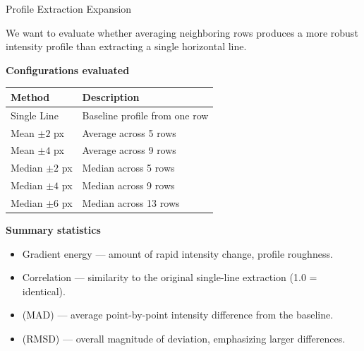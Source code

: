 \documentclass[aspectratio=169]{beamer}
\begin{document}
\begin{frame}{Profile Extraction Expansion}

We want to evaluate whether averaging neighboring rows produces a more robust intensity
profile than extracting a single horizontal line.


\textbf{Configurations evaluated}

\begin{table}
\centering
\small
\begin{tabular}{ll}
\toprule
Method & Description\\
\midrule
Single Line & Baseline profile from one row\\
Mean $\pm2$ px & Average across 5 rows\\
Mean $\pm4$ px & Average across 9 rows\\
Median $\pm2$ px & Median across 5 rows\\
Median $\pm4$ px & Median across 9 rows\\
Median $\pm6$ px & Median across 13 rows\\
\bottomrule
\end{tabular}
\end{table}


\textbf{Summary statistics}

\begin{itemize}
\item Gradient energy — amount of rapid intensity change, profile roughness.
\item Correlation — similarity to the original single-line extraction (1.0 = identical).
\item (MAD) — average point-by-point intensity difference from the baseline.
\item (RMSD) — overall magnitude of deviation, emphasizing larger differences.
\end{itemize}

\end{frame}
\end{document}
